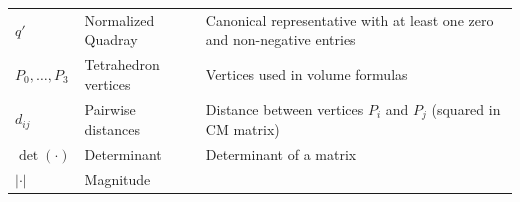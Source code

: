 \documentclass[
  10pt,
]{article}
\begin{document}
\begin{longtable}[]{@{}lll@{}}
\begin{minipage}[t]{0.30\columnwidth}\raggedright
\(q'\)\strut
\end{minipage} & \begin{minipage}[t]{0.30\columnwidth}\raggedright
Normalized Quadray\strut
\end{minipage} & \begin{minipage}[t]{0.30\columnwidth}\raggedright
Canonical representative with at least one zero and non-negative
entries\strut
\end{minipage}\tabularnewline
\begin{minipage}[t]{0.30\columnwidth}\raggedright
\(P_0,\ldots,P_3\)\strut
\end{minipage} & \begin{minipage}[t]{0.30\columnwidth}\raggedright
Tetrahedron vertices\strut
\end{minipage} & \begin{minipage}[t]{0.30\columnwidth}\raggedright
Vertices used in volume formulas\strut
\end{minipage}\tabularnewline
\begin{minipage}[t]{0.30\columnwidth}\raggedright
\(d_{ij}\)\strut
\end{minipage} & \begin{minipage}[t]{0.30\columnwidth}\raggedright
Pairwise distances\strut
\end{minipage} & \begin{minipage}[t]{0.30\columnwidth}\raggedright
Distance between vertices \(P_i\) and \(P_j\) (squared in CM
matrix)\strut
\end{minipage}\tabularnewline
\begin{minipage}[t]{0.30\columnwidth}\raggedright
\(\det(\cdot)\)\strut
\end{minipage} & \begin{minipage}[t]{0.30\columnwidth}\raggedright
Determinant\strut
\end{minipage} & \begin{minipage}[t]{0.30\columnwidth}\raggedright
Determinant of a matrix\strut
\end{minipage}\tabularnewline
\begin{minipage}[t]{0.30\columnwidth}\raggedright
\(\lvert\cdot\rvert\)\strut
\end{minipage} & \begin{minipage}[t]{0.30\columnwidth}\raggedright
Magnitude\strut
\end{minipage} & \begin{minipage}[t]{0.30\columnwidth}\raggedright

\end{minipage}
\end{longtable}
\end{document}
